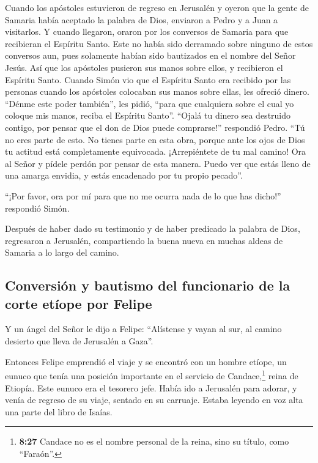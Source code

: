  Cuando los apóstoles estuvieron de regreso en Jerusalén
y oyeron que la gente de Samaria había aceptado la palabra de Dios,
enviaron a Pedro y a Juan a visitarlos.  Y cuando
llegaron, oraron por los conversos de Samaria para que recibieran el
Espíritu Santo.  Este no había sido derramado sobre
ninguno de estos conversos aun, pues solamente habían sido bautizados en
el nombre del Señor Jesús.  Así que los apóstoles
pusieron sus manos sobre ellos, y recibieron el Espíritu Santo.
 Cuando Simón vio que el Espíritu Santo era recibido por
las personas cuando los apóstoles colocaban sus manos sobre ellas, les
ofreció dinero.  ``Dénme este poder también'', les pidió,
``para que cualquiera sobre el cual yo coloque mis manos, reciba el
Espíritu Santo''.  ``Ojalá tu dinero sea destruido
contigo, por pensar que el don de Dios puede comprarse!'' respondió
Pedro.  ``Tú no eres parte de esto. No tienes parte en
esta obra, porque ante los ojos de Dios tu actitud está completamente
equivocada.  ¡Arrepiéntete de tu mal camino! Ora al Señor
y pídele perdón por pensar de esta manera.  Puedo ver que
estás lleno de una amarga envidia, y estás encadenado por tu propio
pecado''.

 ``¡Por favor, ora por mí para que no me ocurra nada de
lo que has dicho!'' respondió Simón.

 Después de haber dado su testimonio y de haber predicado
la palabra de Dios, regresaron a Jerusalén, compartiendo la buena nueva
en muchas aldeas de Samaria a lo largo del camino.

\hypertarget{conversiuxf3n-y-bautismo-del-funcionario-de-la-corte-etuxedope-por-felipe}{%
\subsection{Conversión y bautismo del funcionario de la corte etíope por
Felipe}\label{conversiuxf3n-y-bautismo-del-funcionario-de-la-corte-etuxedope-por-felipe}}

 Y un ángel del Señor le dijo a Felipe: ``Alístense y
vayan al sur, al camino desierto que lleva de Jerusalén a Gaza''.

 Entonces Felipe emprendió el viaje y se encontró con un
hombre etíope, un eunuco que tenía una posición importante en el
servicio de Candace,\footnote{\textbf{8:27} Candace no es el nombre
  personal de la reina, sino su título, como ``Faraón''.} reina de
Etiopía. Este eunuco era el tesorero jefe. Había ido a Jerusalén para
adorar,  y venía de regreso de su viaje, sentado en su
carruaje. Estaba leyendo en voz alta una parte del libro de Isaías.

